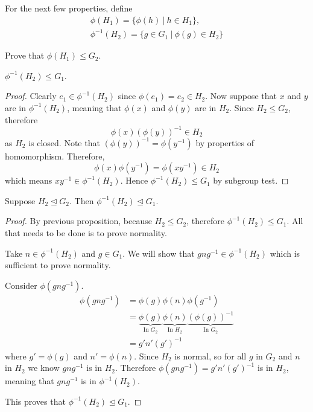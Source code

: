 \newpage

For the next few properties, define
\begin{gather*}
    \phi(H_1) = \{\phi(h) \ | \ h \in H_1\},\\
    \phi^{-1}(H_2) = \{g \in G_1 \ | \ \phi(g) \in H_2\}
\end{gather*}

\begin{exercise}
    Prove that $\phi(H_1) \leq G_2$.
\end{exercise}

\begin{proposition}\label{prop-homomorphism-inverse-is-subgroup}
    $\phi^{-1}(H_2) \leq G_1$.
\end{proposition}
\begin{proof}
    Clearly $e_1 \in \phi^{-1}(H_2)$ since $\phi(e_1) = e_2 \in H_2$. Now suppose that $x$ and $y$ are in $\phi^{-1}(H_2)$, meaning that $\phi(x)$ and $\phi(y)$ are in $H_2$. Since $H_2 \leq G_2$, therefore
    \[
        \phi(x)\left(\phi(y)\right)^{-1} \in H_2
    \]
    as $H_2$ is closed. Note that $\left(\phi(y)\right)^{-1} = \phi(y^{-1})$ by properties of homomorphism. Therefore,
    \[
        \phi(x)\phi(y^{-1}) = \phi(xy^{-1}) \in H_2
    \]
    which means $xy^{-1} \in \phi^{-1}(H_2)$. Hence $\phi^{-1}(H_2) \leq G_1$ by subgroup test.
\end{proof}

\begin{proposition}
    Suppose $H_2 \unlhd G_2$. Then $\phi^{-1}(H_2) \unlhd G_1$.
\end{proposition}
\begin{proof}
    By previous proposition, because $H_2 \leq G_2$, therefore $\phi^{-1}(H_2) \leq G_1$. All that needs to be done is to prove normality.

    Take $n \in \phi^{-1}(H_2)$ and $g \in G_1$. We will show that $gng^{-1} \in \phi^{-1}(H_2)$ which is sufficient to prove normality.

    Consider $\phi(gng^{-1})$.
    \begin{align*}
        \phi(gng^{-1}) &= \phi(g)\phi(n)\phi(g^{-1}) \\
        &= \underbrace{\phi(g)}_{\text{In }G_2} \underbrace{\phi(n)}_{\text{In }H_2} \underbrace{\left(\phi(g)\right)^{-1}}_{\text{In }G_2}\\
        &= g'n'(g')^{-1}
    \end{align*}
    where $g' = \phi(g)$ and $n' = \phi(n)$. Since $H_2$ is normal, so for all $g$ in $G_2$ and $n$ in $H_2$ we know $gng^{-1}$ is in $H_2$. Therefore $\phi(gng^{-1}) = g'n'(g')^{-1}$ is in $H_2$, meaning that $gng^{-1}$ is in $\phi^{-1}(H_2)$.

    This proves that $\phi^{-1}(H_2) \unlhd G_1$.
\end{proof}

